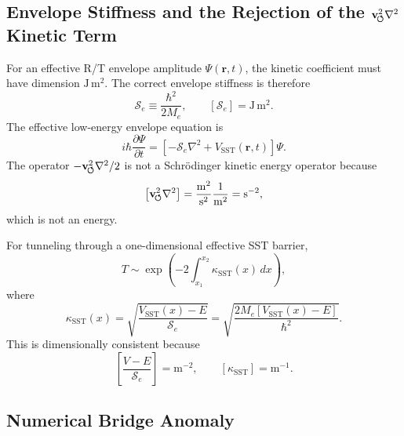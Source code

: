     \subsection{Envelope Stiffness and the Rejection of the \texorpdfstring{\(\mathbf{v}_{\!\boldsymbol{\circlearrowleft}}^2\nabla^2\)}{vswirl2 Laplacian} Kinetic Term}
        
        For an effective R/T envelope amplitude \(\Psi(\mathbf r,t)\), the kinetic
        coefficient must have dimension \(\mathrm{J\,m^2}\). The correct envelope
        stiffness is therefore
        \[
            \mathcal S_e
            \equiv
            \frac{\hbar^2}{2M_e},
            \qquad
            [\mathcal S_e]=\mathrm{J\,m^2}.
        \]
        The effective low-energy envelope equation is
        \[
            i\hbar\frac{\partial\Psi}{\partial t}
            =
            \left[
                -\mathcal S_e\nabla^2
            +
            V_{\mathrm{SST}}(\mathbf r,t)
            \right]\Psi .
        \]
        The operator \(-\mathbf{v}_{\!\boldsymbol{\circlearrowleft}}^2\nabla^2/2\) is not a Schrödinger kinetic energy
        operator because
        \[
            \left[\mathbf{v}_{\!\boldsymbol{\circlearrowleft}}^2\nabla^2\right]
            =
            \frac{\mathrm{m^2}}{\mathrm{s^2}}\frac{1}{\mathrm{m^2}}
            =
            \mathrm{s^{-2}},
        \]
        which is not an energy.
        
        For tunneling through a one-dimensional effective SST barrier,
        \[
            T
            \sim
            \exp\left(
                    -2\int_{x_1}^{x_2}\kappa_{\mathrm{SST}}(x)\,dx
            \right),
        \]
        where
        \[
            \kappa_{\mathrm{SST}}(x)
            =
            \sqrt{
                \frac{V_{\mathrm{SST}}(x)-E}{\mathcal S_e}
            }
            =
            \sqrt{
                \frac{2M_e\left[V_{\mathrm{SST}}(x)-E\right]}{\hbar^2}
            }.
        \]
        This is dimensionally consistent because
        \[
            \left[
                \frac{V-E}{\mathcal S_e}
            \right]
            =
            \mathrm{m^{-2}},
            \qquad
            [\kappa_{\mathrm{SST}}]=\mathrm{m^{-1}}.
        \]
    
    \subsection{Numerical Bridge Anomaly}
        
